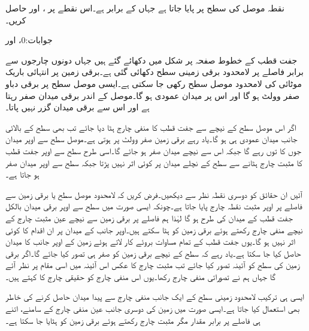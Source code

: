 نقطہ  موصل کی سطح پر پایا جاتا ہے جہاں  کے برابر ہے۔اس نقطے  پر ،  اور  حاصل کریں۔

جوابات:0،  اور 

جفت قطب کے خطوط صفحہ  پر  شکل  میں دکھائے گئے ہیں جہاں دونوں چارجوں سے برابر فاصلے پر لامحدود برقی زمینی سطح دکھائی گئی ہے۔برقی زمین پر انتہائی باریک موٹائی کی لامحدود موصل سطح رکھی جا سکتی ہے۔ایسی موصل سطح پر برقی دباو صفر وولٹ ہو گا اور اس پر میدان عمودی ہو گا۔موصل کے اندر برقی میدان صفر رہتا ہے اور اس سے برقی میدان گزر نہیں پاتا۔

اگر اس موصل سطح کے نیچے سے جفت قطب کا منفی چارج ہٹا دیا جائے تب بھی سطح کے بالائی جانب میدان عمودی ہی ہو گا۔یاد رہے برقی زمین صفر وولٹ پر ہوتی ہے۔موصل سطح سے اوپر میدان جوں کا توں رہے گا جبکہ اس سے نیچے میدان صفر ہو جائے گا۔اسی طرح سطح سے اوپر  جفت قطب کا مثبت چارج ہٹانے سے سطح کے نچلے میدان پر کوئی اثر نہیں پڑتا جبکہ سطح سے اوپر میدان صفر ہو جاتا ہے۔

آئیں ان حقائق کو دوسری نقطہ نظر سے دیکھیں۔فرض کریں کہ لامحدود موصل سطح یا برقی زمین سے  فاصلے پر  اوپر مثبت نقطہ چارج  پایا جاتا ہے۔چونکہ ایسی صورت میں سطح سے اوپر برقی میدان بالکل جفت قطب کے میدان کی طرح ہو گا لہٰذا ہم  فاصلے پر برقی زمین سے نیچے عین مثبت چارج کے نیچے منفی چارج  رکھتے ہوئے برقی زمین کو ہٹا سکتے ہیں۔اوپر جانب کے میدان پر ان اقدام کا کوئی اثر نہیں ہو گا۔یوں جفت قطب کے تمام مساوات بروئے کار لاتے ہوئے زمین کے اوپر جانب کا میدان حاصل کیا جا سکتا ہے۔یاد رہے کہ سطح کے نیچے برقی زمین کو صفر ہی تصور کیا جائے گا۔اگر برقی زمین کی سطح کو آئینہ تصور کیا جائے تب مثبت چارج کا عکس اس آئینہ میں اسی مقام پر نظر آئے گا جہاں ہم نے تصوراتی منفی چارج رکھا۔یوں اس منفی چارج کو حقیقی چارج کا  کہتے ہیں۔

ایسی ہی ترکیب لامحدود زمینی سطح کے ایک جانب منفی چارج سے پیدا میدان حاصل کرنے کی خاطر بھی استعمال کیا جاتا ہے۔ایسی صورت میں زمین کی دوسری جانب عین منفی چارج کے سامنے،  اتنے ہی فاصلے پر برابر مقدار مگر مثبت چارج رکھتے ہوئے برقی زمین کو ہٹایا جا سکتا ہے۔

